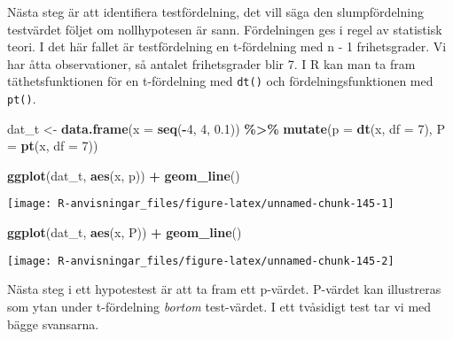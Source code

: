 \documentclass[
]{book}
\newenvironment{Shaded}{\begin{snugshade}}{\end{snugshade}}
\newcommand{\AttributeTok}[1]{\textcolor[rgb]{0.13,0.29,0.53}{#1}}
\newcommand{\DecValTok}[1]{\textcolor[rgb]{0.00,0.00,0.81}{#1}}
\newcommand{\FloatTok}[1]{\textcolor[rgb]{0.00,0.00,0.81}{#1}}
\newcommand{\FunctionTok}[1]{\textcolor[rgb]{0.13,0.29,0.53}{\textbf{#1}}}
\newcommand{\NormalTok}[1]{#1}
\newcommand{\OtherTok}[1]{\textcolor[rgb]{0.56,0.35,0.01}{#1}}
\newcommand{\SpecialCharTok}[1]{\textcolor[rgb]{0.81,0.36,0.00}{\textbf{#1}}}
\theoremstyle{definition}
\theoremstyle{definition}
\theoremstyle{definition}
\theoremstyle{definition}
\theoremstyle{remark}
\begin{document}
Nästa steg är att identifiera testfördelning, det vill säga den slumpfördelning testvärdet följet om nollhypotesen är sann. Fördelningen ges i regel av statistisk teori. I det här fallet är testfördelning en t-fördelning med n - 1 frihetsgrader. Vi har åtta observationer, så antalet frihetsgrader blir 7. I R kan man ta fram täthetsfunktionen för en t-fördelning med \texttt{dt()} och fördelningsfunktionen med \texttt{pt()}.

\begin{Shaded}
\begin{Highlighting}[]
\NormalTok{dat\_t }\OtherTok{\textless{}{-}} \FunctionTok{data.frame}\NormalTok{(}\AttributeTok{x =} \FunctionTok{seq}\NormalTok{(}\SpecialCharTok{{-}}\DecValTok{4}\NormalTok{, }\DecValTok{4}\NormalTok{, }\FloatTok{0.1}\NormalTok{)) }\SpecialCharTok{\%\textgreater{}\%} 
  \FunctionTok{mutate}\NormalTok{(}\AttributeTok{p =} \FunctionTok{dt}\NormalTok{(x, }\AttributeTok{df =} \DecValTok{7}\NormalTok{),}
         \AttributeTok{P =} \FunctionTok{pt}\NormalTok{(x, }\AttributeTok{df =} \DecValTok{7}\NormalTok{))}

\FunctionTok{ggplot}\NormalTok{(dat\_t, }\FunctionTok{aes}\NormalTok{(x, p)) }\SpecialCharTok{+}
  \FunctionTok{geom\_line}\NormalTok{()}
\end{Highlighting}
\end{Shaded}

\begin{center}\texttt{[image: R-anvisningar\_files/figure-latex/unnamed-chunk-145-1]} \end{center}

\begin{Shaded}
\begin{Highlighting}[]
\FunctionTok{ggplot}\NormalTok{(dat\_t, }\FunctionTok{aes}\NormalTok{(x, P)) }\SpecialCharTok{+}
  \FunctionTok{geom\_line}\NormalTok{()}
\end{Highlighting}
\end{Shaded}

\begin{center}\texttt{[image: R-anvisningar\_files/figure-latex/unnamed-chunk-145-2]} \end{center}

Nästa steg i ett hypotestest är att ta fram ett p-värdet. P-värdet kan illustreras som ytan under t-fördelning \emph{bortom} test-värdet. I ett tvåsidigt test tar vi med bägge svansarna.
\end{document}
